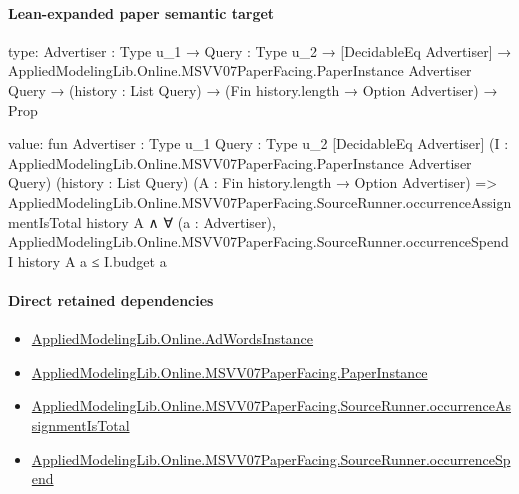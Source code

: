 \documentclass[10pt]{article}
\begin{document}
\paragraph{Lean-expanded paper semantic target}
\begin{ReviewVerbatim}
type:
{Advertiser : Type u_1} →
  {Query : Type u_2} →
    [DecidableEq Advertiser] →
      AppliedModelingLib.Online.MSVV07PaperFacing.PaperInstance Advertiser Query →
        (history : List Query) → (Fin history.length → Option Advertiser) → Prop

value:
fun {Advertiser : Type u_1} {Query : Type u_2} [DecidableEq Advertiser]
    (I : AppliedModelingLib.Online.MSVV07PaperFacing.PaperInstance Advertiser Query) (history : List Query)
    (A : Fin history.length → Option Advertiser) =>
  AppliedModelingLib.Online.MSVV07PaperFacing.SourceRunner.occurrenceAssignmentIsTotal history A ∧
    ∀ (a : Advertiser),
      AppliedModelingLib.Online.MSVV07PaperFacing.SourceRunner.occurrenceSpend I history A a ≤ I.budget a
\end{ReviewVerbatim}

\paragraph{Direct retained dependencies}
\begin{itemize}\raggedright
\item \hyperlink{governing-declaration-e5ce49672bf26ab1}{Applied\allowbreak{}Modeling\allowbreak{}Lib.\allowbreak{}Online.\allowbreak{}Ad\allowbreak{}Words\allowbreak{}Instance}
\item \hyperlink{governing-declaration-11907576ec71eeb5}{Applied\allowbreak{}Modeling\allowbreak{}Lib.\allowbreak{}Online.\allowbreak{}MSVV07\allowbreak{}Paper\allowbreak{}Facing.\allowbreak{}Paper\allowbreak{}Instance}
\item \hyperlink{governing-declaration-49776f2c057d3643}{Applied\allowbreak{}Modeling\allowbreak{}Lib.\allowbreak{}Online.\allowbreak{}MSVV07\allowbreak{}Paper\allowbreak{}Facing.\allowbreak{}Source\allowbreak{}Runner.\allowbreak{}occurrence\allowbreak{}Assignment\allowbreak{}Is\allowbreak{}Total}
\item \hyperlink{governing-declaration-7fc0f371ea84f275}{Applied\allowbreak{}Modeling\allowbreak{}Lib.\allowbreak{}Online.\allowbreak{}MSVV07\allowbreak{}Paper\allowbreak{}Facing.\allowbreak{}Source\allowbreak{}Runner.\allowbreak{}occurrence\allowbreak{}Spend}
\end{itemize}
\end{document}
